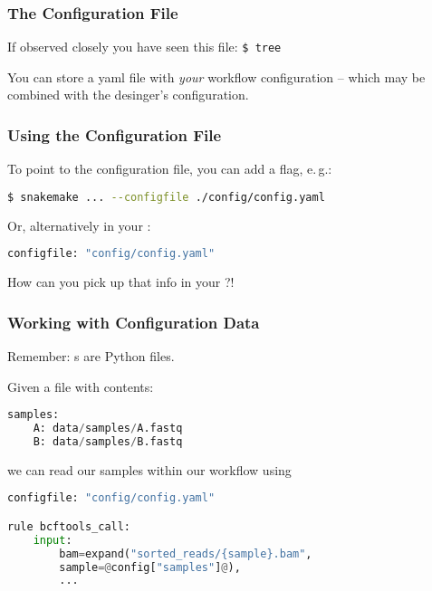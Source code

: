 \begin{frame}
  \frametitle{The Configuration File}
  If observed closely you have seen this file:\newline
            {\tiny \DTsetlength{0.2em}{1em}{0.2em}{0.4pt}{.6pt}
\texttt{\$ tree}
}
 \pause
 \begin{docs}
 	You can store a yaml file with \emph{your} workflow configuration -- which may be combined with the desinger's configuration.
 \end{docs}
\end{frame}

\begin{frame}[fragile]
  \frametitle{Using the Configuration File}
  To point to the configuration file, you can add a flag, e.\,g.:
  \begin{lstlisting}[language=Bash, style=Shell]
$ snakemake ... --configfile ./config/config.yaml  
  \end{lstlisting}
  Or, alternatively in your :
  \begin{lstlisting}[language=Python,style=Python]
configfile: "config/config.yaml"
  \end{lstlisting}  
  \begin{question}
  	How can you pick up that info in your ?!
  \end{question}
\end{frame} 

\begin{frame}[fragile]
  \frametitle{Working with Configuration Data}
  \begin{hint}
  	Remember: s are Python files.
  \end{hint}
  \pause
  Given a file  with contents:
  \begin{lstlisting}[language=Python,style=Python]
samples:
    A: data/samples/A.fastq
    B: data/samples/B.fastq
  \end{lstlisting}
  we can read our samples within our workflow using
  \begin{lstlisting}[language=Python,style=Python]
configfile: "config/config.yaml"

rule bcftools_call:
    input:
        bam=expand("sorted_reads/{sample}.bam", 
        sample=@config["samples"]@),
        ...
  \end{lstlisting}
\end{frame}

